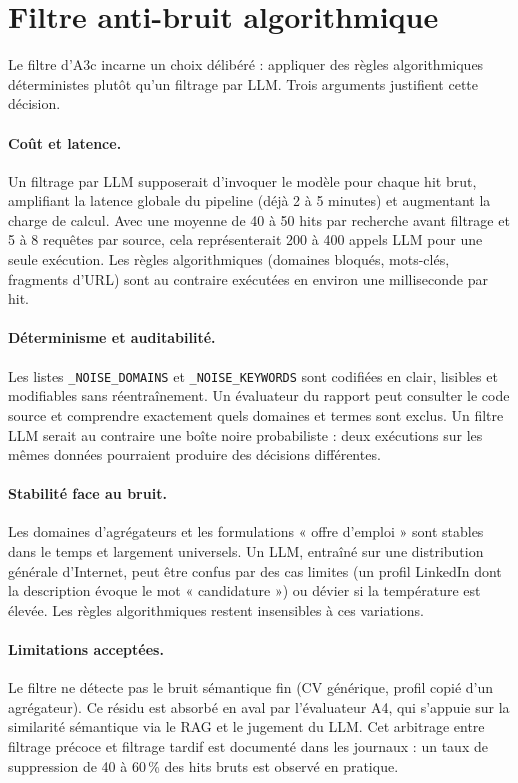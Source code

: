 

\section{Filtre anti-bruit algorithmique}

Le filtre d'A3c incarne un choix délibéré : appliquer des règles algorithmiques déterministes plutôt qu'un filtrage par LLM. Trois arguments justifient cette décision.

\paragraph{Coût et latence.}
Un filtrage par LLM supposerait d'invoquer le modèle pour chaque hit brut, amplifiant la latence globale du pipeline (déjà 2 à 5 minutes) et augmentant la charge de calcul. Avec une moyenne de 40 à 50 hits par recherche avant filtrage et 5 à 8 requêtes par source, cela représenterait 200 à 400 appels LLM pour une seule exécution. Les règles algorithmiques (domaines bloqués, mots-clés, fragments d'URL) sont au contraire exécutées en environ une milliseconde par hit.

\paragraph{Déterminisme et auditabilité.}
Les listes \texttt{\_NOISE\_DOMAINS} et \texttt{\_NOISE\_KEYWORDS} sont codifiées en clair, lisibles et modifiables sans réentraînement. Un évaluateur du rapport peut consulter le code source et comprendre exactement quels domaines et termes sont exclus. Un filtre LLM serait au contraire une boîte noire probabiliste : deux exécutions sur les mêmes données pourraient produire des décisions différentes.

\paragraph{Stabilité face au bruit.}
Les domaines d'agrégateurs et les formulations « offre d'emploi » sont stables dans le temps et largement universels. Un LLM, entraîné sur une distribution générale d'Internet, peut être confus par des cas limites (un profil LinkedIn dont la description évoque le mot « candidature ») ou dévier si la température est élevée. Les règles algorithmiques restent insensibles à ces variations.

\paragraph{Limitations acceptées.}
Le filtre ne détecte pas le bruit sémantique fin (CV générique, profil copié d'un agrégateur). Ce résidu est absorbé en aval par l'évaluateur A4, qui s'appuie sur la similarité sémantique via le RAG et le jugement du LLM. Cet arbitrage entre filtrage précoce et filtrage tardif est documenté dans les journaux : un taux de suppression de 40 à 60\,\% des hits bruts est observé en pratique.

